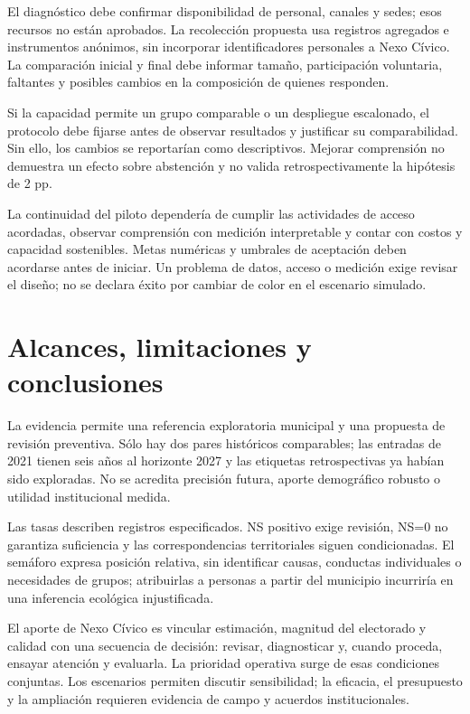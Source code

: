 \documentclass[12pt,a4paper]{article}
\newcommand{\primerparrafo}{\par\noindent\hspace*{1.1em}}
\newcommand{\iniciartabla}{\rowcolors{2}{NCSurfaceMuted}{white}}
\newcommand{\terminartabla}{\rowcolors{1}{}{}}
\newcommand{\pagina}[1]{\clearpage\section{#1}}
\begin{document}
\iniciartabla

\terminartabla

El diagnóstico debe confirmar disponibilidad de personal, canales y sedes; esos recursos no están aprobados. La recolección propuesta usa registros agregados e instrumentos anónimos, sin incorporar identificadores personales a Nexo Cívico. La comparación inicial y final debe informar tamaño, participación voluntaria, faltantes y posibles cambios en la composición de quienes responden.

Si la capacidad permite un grupo comparable o un despliegue escalonado, el protocolo debe fijarse antes de observar resultados y justificar su comparabilidad. Sin ello, los cambios se reportarían como descriptivos. Mejorar comprensión no demuestra un efecto sobre abstención y no valida retrospectivamente la hipótesis de 2 pp.

La continuidad del piloto dependería de cumplir las actividades de acceso acordadas, observar comprensión con medición interpretable y contar con costos y capacidad sostenibles. Metas numéricas y umbrales de aceptación deben acordarse antes de iniciar. Un problema de datos, acceso o medición exige revisar el diseño; no se declara éxito por cambiar de color en el escenario simulado.

\pagina{Alcances, limitaciones y conclusiones}
\primerparrafo
La evidencia permite una referencia exploratoria municipal y una propuesta de revisión preventiva. Sólo hay dos pares históricos comparables; las entradas de 2021 tienen seis años al horizonte 2027 y las etiquetas retrospectivas ya habían sido exploradas. No se acredita precisión futura, aporte demográfico robusto o utilidad institucional medida.

Las tasas describen registros especificados. NS positivo exige revisión, NS=0 no garantiza suficiencia y las correspondencias territoriales siguen condicionadas. El semáforo expresa posición relativa, sin identificar causas, conductas individuales o necesidades de grupos; atribuirlas a personas a partir del municipio incurriría en una inferencia ecológica injustificada.

El aporte de Nexo Cívico es vincular estimación, magnitud del electorado y calidad con una secuencia de decisión: revisar, diagnosticar y, cuando proceda, ensayar atención y evaluarla. La prioridad operativa surge de esas condiciones conjuntas. Los escenarios permiten discutir sensibilidad; la eficacia, el presupuesto y la ampliación requieren evidencia de campo y acuerdos institucionales.

\vspace{0.15cm}
{}
\renewcommand{\refname}{Referencias}
\begingroup
\small
\singlespacing
\raggedright


\endgroup
\end{document}
